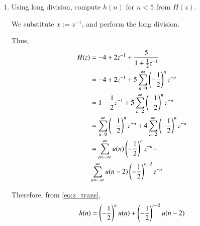 \documentclass[journal,12pt,twocolumn]{IEEEtran}
\renewcommand\thesection{\arabic{section}}
\begin{document}
\begin{enumerate}[label=\thesection.\arabic*]

\item Using long division, compute $h(n)$ for $n < 5$ from $H(z)$.

\solution We substitute $x := z^{-1}$, and perform the long division.


Thus,
\begin{align}
	H(z) &= -4 + 2z^{-1} + \frac{5}{1 + \frac{1}{2}z^{-1}} \\
		 &= -4 + 2z^{-1} + 5\sum_{n = 0}^{\infty}\left(-\frac{1}{2}\right)^nz^{-n} \\
		 &= 1 - \frac{1}{2}z^{-1} + 5\sum_{n = 2}^{\infty}\left(-\frac{1}{2}\right)^nz^{-n} \\
		 &= \sum_{n = 0}^{\infty}\left(-\frac{1}{2}\right)^nz^{-n} + 4\sum_{n = 2}^{\infty}\left(-\frac{1}{2}\right)^nz^{-n} \\
		 &= \sum_{n = -\infty}^{\infty}u(n)\left(-\frac{1}{2}\right)^nz^{-n} + \nonumber \\
		 &\sum_{n = -\infty}^{\infty}u(n - 2)\left(-\frac{1}{2}\right)^{n - 2}z^{-n}
\end{align}

Therefore, from \eqref{eq:z_trans}, 
\begin{align}
	h(n) = \left(-\frac{1}{2}\right)^{n}u(n) + \left(-\frac{1}{2}\right)^{n-2}u(n-2)
\end{align}



\end{enumerate}
\end{document}
